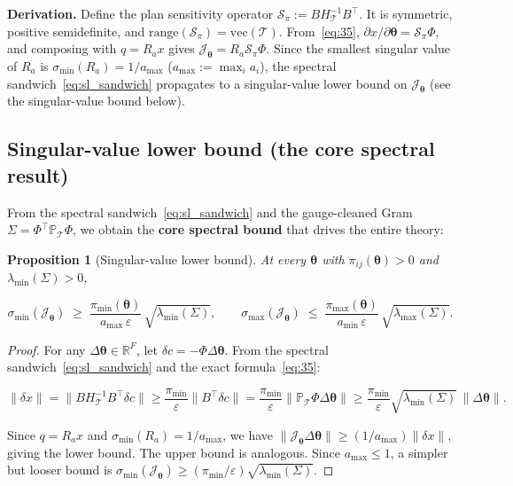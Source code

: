\documentclass[11pt,a4paper]{article}
\newtheorem{proposition}[theorem]{Proposition}
\theoremstyle{remark}
\begin{document}
\textbf{Derivation.} Define the plan sensitivity operator
$\mathscr{S}_\pi:=B H_{\mathcal{T}}^{-1}B^{\top}$. It is symmetric, positive semidefinite,
and $\mathrm{range}(\mathscr{S}_\pi)=\mathrm{vec}(\mathcal{T})$. From~\eqref{eq:35},
$\partial x/\partial\bm{\theta}=\mathscr{S}_\pi\Phi$, and composing with $q=R_a x$ gives
$\mathcal{J}_{\bm{\theta}}=R_a\mathscr{S}_\pi\Phi$. Since the smallest singular value of
$R_a$ is $\sigma_{\min}(R_a)=1/a_{\max}$ ($a_{\max}:=\max_i a_i$), the spectral
sandwich~\eqref{eq:sl_sandwich} propagates to a singular-value lower bound on
$\mathcal{J}_{\bm{\theta}}$ (see the singular-value bound below).

\subsection{Singular-value lower bound (the core spectral result)}

From the spectral sandwich~\eqref{eq:sl_sandwich} and the gauge-cleaned Gram
$\Sigma=\Phi^{\top}\mathbb{P}_{\mathcal{T}}\Phi$, we obtain the \textbf{core spectral
bound} that drives the entire theory:

\begin{proposition}[Singular-value lower bound]\label{prop:sigmamin}
At every $\bm{\theta}$ with $\pi_{ij}(\bm{\theta})>0$ and $\lambda_{\min}(\Sigma)>0$,

\[
\boxed{\sigma_{\min}(\mathcal{J}_{\bm{\theta}})\;\ge\;\frac{\pi_{\min}(\bm{\theta})}{a_{\max}\,\varepsilon}\,\sqrt{\lambda_{\min}(\Sigma)}},\qquad
\boxed{\sigma_{\max}(\mathcal{J}_{\bm{\theta}})\;\le\;\frac{\pi_{\max}(\bm{\theta})}{a_{\min}\,\varepsilon}\,\sqrt{\lambda_{\max}(\Sigma)}}. \label{eq:38}
\]
\end{proposition}

\begin{proof}
For any $\Delta\bm{\theta}\in\mathbb{R}^F$, let $\delta c=-\Phi\Delta\bm{\theta}$. From the
spectral sandwich~\eqref{eq:sl_sandwich} and the exact formula~\eqref{eq:35}:

\[
\|\delta x\| =\|B H_{\mathcal{T}}^{-1} B^{\top}\delta c\|
\ge \frac{\pi_{\min}}{\varepsilon}\|B^{\top}\delta c\|
= \frac{\pi_{\min}}{\varepsilon}\|\mathbb{P}_{\mathcal{T}}\Phi\Delta\bm{\theta}\|
\ge \frac{\pi_{\min}}{\varepsilon}\sqrt{\lambda_{\min}(\Sigma)}\,\|\Delta\bm{\theta}\|.
\]

Since $q=R_a x$ and $\sigma_{\min}(R_a)=1/a_{\max}$, we have
$\|\mathcal{J}_{\bm{\theta}}\Delta\bm{\theta}\|\ge(1/a_{\max})\|\delta x\|$, giving the
lower bound. The upper bound is analogous. Since $a_{\max}\le 1$, a simpler but looser
bound is
$\sigma_{\min}(\mathcal{J}_{\bm{\theta}})\ge(\pi_{\min}/\varepsilon)\sqrt{\lambda_{\min}(\Sigma)}$.
\end{proof}
\end{document}
